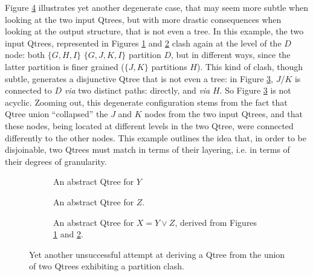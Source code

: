Figure \ref{fig2:qtree-x-y-z-disj-degenerate2} illustrates yet another degenerate case, that may seem more subtle when looking at the two input Qtrees, but with more drastic consequences when looking at the output structure, that is not even a tree. In this example, the two input Qtrees, represented in Figures \ref{fig2:qtree-y''} and \ref{fig2:qtree-z''} clash again at the level of the $D$ node: both $\lbrace G, H, I \rbrace$ $\lbrace G, J, K, I \rbrace$ partition $D$, but in different ways, since the latter partition is finer grained ($\lbrace J, K\rbrace$ partitions $H$). This kind of clash, though subtle, generates a disjunctive Qtree that is not even a tree: in Figure \ref{fig2:qtree-xy-disj-degenerate2}, $J$/$K$ is connected to $D$ \textit{via} two distinct paths: directly, and \textit{via} $H$. So Figure \ref{fig2:qtree-xy-disj-degenerate2} is not acyclic. Zooming out, this degenerate configuration stems from the fact that Qtree union ``collapsed'' the $J$ and $K$ nodes from the two input Qtrees, and that these nodes, being located at different levels in the two Qtree, were connected differently to the other nodes. This example outlines the idea that, in order to be disjoinable, two Qtrees must match in terms of their layering, i.e. in terms of their degrees of granularity.

\begin{figure}[H]
	\centering
	\begin{subfigure}[t]{.3\linewidth}
		\centering
		\caption{An abstract Qtree for $Y$}\label{fig2:qtree-y''}
	\end{subfigure}
	\hfill
	\begin{subfigure}[t]{.3\linewidth}
		\centering\scalebox{.7}{
			\begin{forest}
				[A[{B}][\fbox{C}][{D}[G][J][K][I]]]
		\end{forest}}
		\caption{An abstract Qtree for $Z$.}\label{fig2:qtree-z''}
	\end{subfigure}
	\hfill
	\begin{subfigure}[t]{.3\linewidth}
		\centering{}
		\caption{An abstract Qtree for $X = Y \vee Z$, derived from Figures \ref{fig2:qtree-y''} and \ref{fig2:qtree-z''}.}\label{fig2:qtree-xy-disj-degenerate2}
	\end{subfigure}
	\caption{Yet another unsuccessful attempt at deriving a Qtree from the union of two Qtrees exhibiting a partition clash.}\label{fig2:qtree-x-y-z-disj-degenerate2}
\end{figure}



